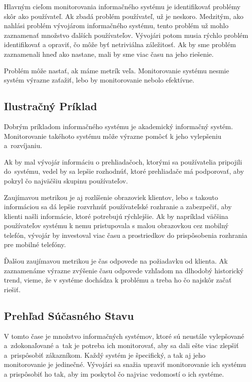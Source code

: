 \documentclass[a4paper, usesections, upjsfrontpage, thesismargins, thesislinespacing]{rnthesis}
\begin{document}
Hlavným cieľom monitorovania informačného systému je identifikovať problémy skôr ako používateľ.
Ak zbadá problém používateľ, už je neskoro.
Medzitým, ako nahlási problém vývojárom informačného systému, tento problém už mohlo zaznamenať množstvo ďalších používateľov.
Vývojári potom musia rýchlo problém identifikovať a opraviť, čo môže byť netriviálna záležitosť.
Ak by sme problém zaznamenali hneď ako nastane, mali by sme viac času na jeho riešenie.

Problém môže nastať, ak máme metrík veľa.
Monitorovanie systému nesmie systém výrazne zaťažiť, lebo by monitorovanie nebolo efektívne.

\subsection{Ilustračný Príklad}

Dobrým príkladom informačného systému je akademický informačný systém.
Monitorovanie takéhoto systému môže výrazne pomôcť k jeho vylepšeniu a~rozví\-janiu.

Ak by mal vývojár informáciu o prehliadačoch, ktorými sa používatelia pripojili do~systému, vedel by sa lepšie rozhodnúť, ktoré prehliadače má podporovať, aby pokryl čo najväčšiu skupinu používateľov.

Zaujímavou metrikou je aj rozlíšenie obrazoviek klientov, lebo s takouto informáciou sa dá lepšie rozvrhnúť používateľské rozhranie a zabezpečiť, aby klienti našli informácie, ktoré potrebujú rýchlejšie.
Ak by napríklad väčšina používateľov systému k nemu pristupovala s malou obrazovkou cez mobilný telefón, vývojár by investoval viac času a prostriedkov do prispôsobenia rozhrania pre mobilné telefóny.

Ďalšou zaujímavou metrikou je čas odpovede na požiadavku od klienta.
Ak zaznamenáme výrazne zvýšenie času odpovede vzhľadom na dlhodobý historický trend, vieme, že v systéme dochádza k problému a treba ho čo najskôr začať riešiť.

\subsection{Prehľad Súčasného Stavu}
 
V tomto čase je množstvo informačných systémov, ktoré sú neustále vylepšované a~zdokonaľované a~tak je potreba ich monitorovať, aby sa dali ešte viac zlepšiť a~prispôsobiť zákazníkom.
Každý systém je špecifický, a tak aj jeho monitorovanie je jedinečné.
Vývojári sa snažia upraviť monitorovanie ich systému a prispôsobiť ho tak, aby im poskytol čo najviac vedomostí o ich systéme.
\end{document}
